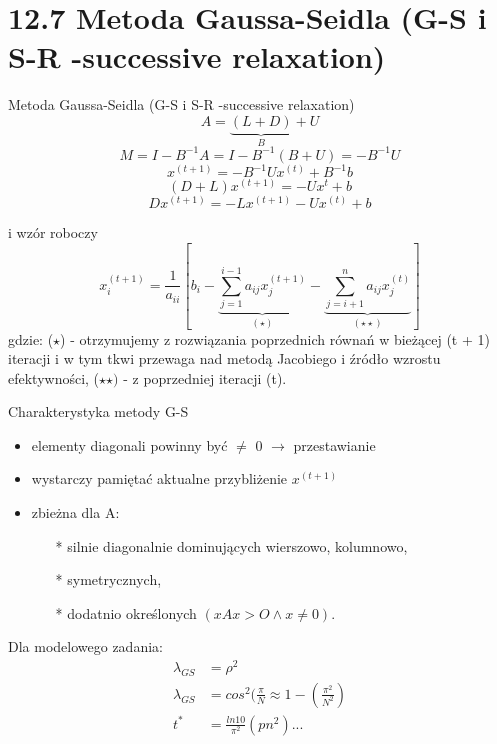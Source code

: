 \section{12.7 Metoda Gaussa-Seidla (G-S i S-R -successive relaxation)}

\begin{frame}{Metoda Gaussa-Seidla (G-S i S-R -successive relaxation)}
  $$A=\underbrace{(L+D)}_{B}+U$$
  $$M=I-B^{-1}A=I-B^{-1}(B+U)=-B^{-1}U$$
  $$x^{(t+1)}=-B^{-1}Ux^{(t)}+B^{-1}b$$
  $$(D+L)x^{(t+1)}=-Ux^t+b$$
  $$\boxed{Dx^{(t+1)}=-Lx^{(t+1)}-Ux^{(t)}+b}$$
\end{frame}

\begin{frame}{}
  i wzór roboczy
  $$x^{(t+1)}_i=\frac{1}{a_{ii}}[b_i-\underbrace{\sum^{i-1}_{j=1} a_{ij}x^{(t+1)}_j}_{(\star)}-\underbrace{\sum^{n}_{j=i+1} a_{ij}x^{(t)}_{j}}_{(\star\star)}]$$
  gdzie: ($\star$) - otrzymujemy z rozwiązania poprzednich równań w bieżącej (t + 1) iteracji i w tym tkwi przewaga nad metodą Jacobiego i źródło wzrostu efektywności, ($\star\star)$ - z poprzedniej iteracji (t).
\end{frame}

\begin{frame}{}
  \begin{block}{Charakterystyka metody G-S}
    \begin{itemize}
      \item elementy diagonali powinny być $\neq$ 0 $\rightarrow$ przestawianie
      \item wystarczy pamiętać aktualne przybliżenie $x^{(t+1)}$
      \item zbieżna dla A:
      \begin{itemize}
        \item[*] silnie diagonalnie dominujących wierszowo, kolumnowo,
        \item[*] symetrycznych,
        \item[*] dodatnio określonych $(xAx>O\wedge x\neq 0)$.
      \end{itemize}
    \end{itemize}
  \end{block}
\end{frame}

\begin{frame}{}
  Dla modelowego zadania:
  \begin{align*}
  \lambda_{GS}&=\rho^2\\
  \lambda_{GS}&=cos^2(\frac{\pi}{N}\approx 1-(\frac{\pi^2}{N^2})\\
          t^* &= \frac{ln10}{\pi^2}(pn^2)...
  \end{align*}
\end{frame}

